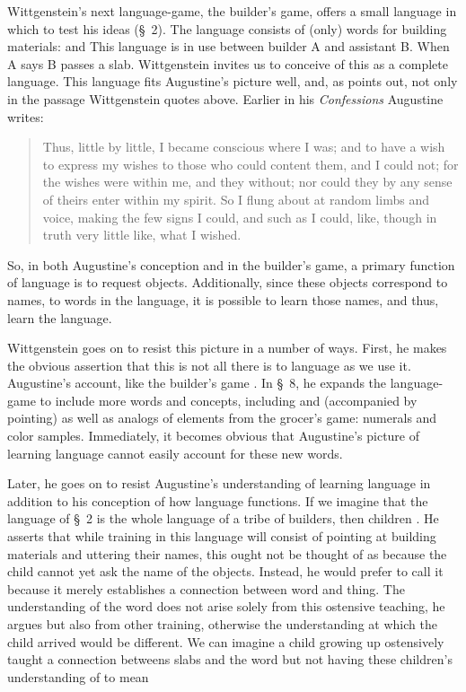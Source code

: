 \documentclass[doc,12pt,apacite,biblatex]{apa6}
\begin{document}
Wittgenstein's next language-game, the builder's game, offers a small language
in which to test his ideas (\S~2). The language consists of (only) words for
building materials:    and  This
language is in use between builder A and assistant B. When A says  B
passes a slab. Wittgenstein invites us to conceive of this as a complete
language. This language fits Augustine's picture well, and, as 
points out, not only in the passage Wittgenstein quotes above. Earlier in his
\emph{Confessions} Augustine writes: \begin{quote} Thus, little by little, I
	became conscious where I was; and to have a wish to express my wishes
	to those who could content them, and I could not; for the wishes were
	within me, and they without; nor could they by any sense of theirs
	enter within my spirit. So I flung about at random limbs and voice,
	making the few signs I could, and such as I could, like, though in
	truth very little like, what I wished. \cite[\S 1.6.8]{Pusey09}
\end{quote} So, in both Augustine's conception and in the builder's game, a
primary function of language is to request objects. Additionally, since these
objects correspond to names, to words in the language, it is possible to learn
those names, and thus, learn the language.

Wittgenstein goes on to resist this picture in a number of ways. First, he
makes the obvious assertion that this is not all there is to language as we use
it. Augustine's account, like the builder's game 
\cite[\S~3]{Wittgenstein53}. In \S~8, he expands the language-game to include
more words and concepts, including  and  (accompanied by
pointing) as well as analogs of elements from the grocer's game: numerals and
color samples. Immediately, it becomes obvious that Augustine's picture of
learning language cannot easily account for these new words.

Later, he goes on to resist Augustine's understanding of learning language in
addition to his conception of how language functions. If we imagine that the
language of \S~2 is the whole language of a tribe of builders, then children
\cite[\S~6]{Wittgenstein53}. He asserts that while training in this language
will consist of pointing at building materials and uttering their names, this
ought not be thought of as  because the child cannot
yet ask the name of the objects. Instead, he would prefer to call it
 because it merely establishes a connection
between word and thing. The understanding of the word does not arise solely
from this ostensive teaching, he argues but also from other training, otherwise
the understanding at which the child arrived would be different. We can imagine
a child growing up ostensively taught a connection betweens slabs and the word
 but not having these children's understanding of  to
mean 
\end{document}

